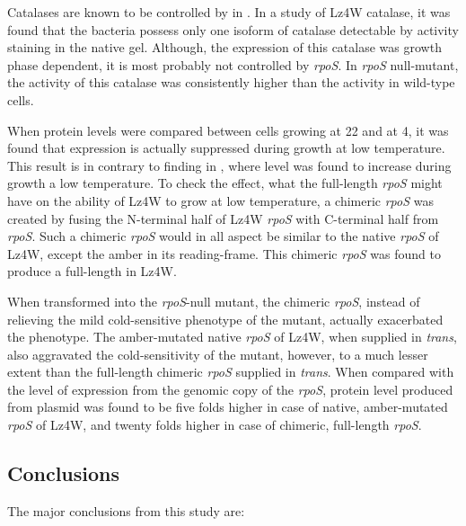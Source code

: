 Catalases are known to be controlled by \sigs{} in . In a
study of  Lz4W catalase, it was found that the bacteria
possess only one isoform of catalase detectable by activity
staining in the native gel. Although, the expression of this
catalase was growth phase dependent, it is most probably not
controlled by \emph{rpoS}\@. In \emph{rpoS} null-mutant, the
activity of this catalase was consistently higher than the
activity in wild-type cells.

When \sigs{} protein levels were compared between cells growing at
22\dg{} and at 4\dg{}, it was found that \sigs{} expression is
actually suppressed during growth at low temperature. This result
is in contrary to finding in , where \sigs{} level was
found to increase during growth a low temperature. To check the
effect, what the full-length \emph{rpoS} might have on the ability
of  Lz4W to grow at low temperature, a chimeric
\emph{rpoS} was created by fusing the N-terminal half of Lz4W
\emph{rpoS} with C-terminal half from  \emph{rpoS}\@.
Such a chimeric \emph{rpoS} would in all aspect be similar to the
native \emph{rpoS} of Lz4W, except the amber in its reading-frame.
This chimeric \emph{rpoS} was found to produce a full-length
\sigs{} in Lz4W.

When transformed into the \emph{rpoS}-null mutant, the chimeric
\emph{rpoS}, instead of relieving the mild cold-sensitive
phenotype of the mutant, actually exacerbated the phenotype. The
amber-mutated native \emph{rpoS} of Lz4W, when supplied in
\emph{trans}, also aggravated the cold-sensitivity of the mutant,
however, to a much lesser extent than the full-length chimeric
\emph{rpoS} supplied in \emph{trans}. When compared with the level
of \sigs{} expression from the genomic copy of the \emph{rpoS},
\sigs{} protein level produced from plasmid was found to be five
folds higher in case of native, amber-mutated \emph{rpoS} of Lz4W,
and twenty folds higher in case of chimeric, full-length
\emph{rpoS}.

\subsection*{Conclusions}

The major conclusions from this study are:

